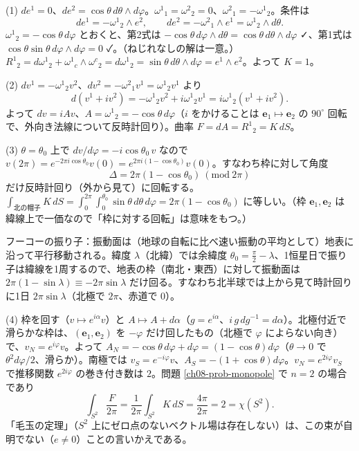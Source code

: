 \begin{solution}
(1) $de^1=0$、$de^2=\cos\theta\,d\theta\wedge d\varphi$。$\omega^1{}_1=\omega^2{}_2=0$、$\omega^2{}_1=-\omega^1{}_2$。条件は
\[
de^1=-\omega^1{}_2\wedge e^2,\qquad de^2=-\omega^2{}_1\wedge e^1=\omega^1{}_2\wedge d\theta .
\]
$\omega^1{}_2=-\cos\theta\,d\varphi$ とおくと、第2式は $-\cos\theta\,d\varphi\wedge d\theta=\cos\theta\,d\theta\wedge d\varphi$ ✓、第1式は $\cos\theta\sin\theta\,d\varphi\wedge d\varphi=0$ ✓。（ねじれなしの解は一意。）$R^1{}_2=d\omega^1{}_2+\omega^1{}_c\wedge\omega^c{}_2=d\omega^1{}_2=\sin\theta\,d\theta\wedge d\varphi=e^1\wedge e^2$。よって $K=1$。

(2) $dv^1=-\omega^1{}_2v^2$、$dv^2=-\omega^2{}_1v^1=\omega^1{}_2v^1$ より
\[
d(v^1+iv^2)=-\omega^1{}_2v^2+i\omega^1{}_2v^1=i\omega^1{}_2(v^1+iv^2).
\]
よって $dv=iAv$、$A=\omega^1{}_2=-\cos\theta\,d\varphi$（$i$ をかけることは $\bm e_1\mapsto\bm e_2$ の $90^\circ$ 回転で、外向き法線について反時計回り）。曲率 $F=dA=R^1{}_2=K\,dS$。

(3) $\theta=\theta_0$ 上で $dv/d\varphi=-i\cos\theta_0\,v$ なので $v(2\pi)=e^{-2\pi i\cos\theta_0}v(0)=e^{2\pi i(1-\cos\theta_0)}v(0)$。すなわち枠に対して角度
\[
\Delta=2\pi(1-\cos\theta_0)\ (\mathrm{mod}\ 2\pi)
\]
だけ反時計回り（外から見て）に回転する。$\int_{\text{北の帽子}}K\,dS=\int_0^{2\pi}\!\int_0^{\theta_0}\sin\theta\,d\theta\,d\varphi=2\pi(1-\cos\theta_0)$ に等しい。（枠 $\bm e_1,\bm e_2$ は緯線上で一価なので「枠に対する回転」は意味をもつ。）

フーコーの振り子：振動面は（地球の自転に比べ速い振動の平均として）地表に沿って平行移動される。緯度 $\lambda$（北緯）では余緯度 $\theta_0=\frac\pi2-\lambda$、1恒星日で振り子は緯線を1周するので、地表の枠（南北・東西）に対して振動面は $2\pi(1-\sin\lambda)\equiv-2\pi\sin\lambda$ だけ回る。すなわち北半球では上から見て時計回りに1日 $2\pi\sin\lambda$（北極で $2\pi$、赤道で $0$）。

(4) 枠を回す（$v\mapsto e^{i\alpha}v$）と $A\mapsto A+d\alpha$（$g=e^{i\alpha}$、$i\,g\,dg^{-1}=d\alpha$）。北極付近で滑らかな枠は、$(\bm e_1,\bm e_2)$ を $-\varphi$ だけ回したもの（北極で $\varphi$ によらない向き）で、$v_N=e^{i\varphi}v$。よって $A_N=-\cos\theta\,d\varphi+d\varphi=(1-\cos\theta)d\varphi$（$\theta\to0$ で $\theta^2d\varphi/2$、滑らか）。南極では $v_S=e^{-i\varphi}v$、$A_S=-(1+\cos\theta)d\varphi$。$v_N=e^{2i\varphi}v_S$ で推移関数 $e^{2i\varphi}$ の巻き付き数は $2$。問題 \ref{ch08-prob-monopole} で $n=2$ の場合であり
\[
\int_{S^2}\frac{F}{2\pi}=\frac1{2\pi}\int_{S^2}K\,dS=\frac{4\pi}{2\pi}=2=\chi(S^2).
\]
「毛玉の定理」（$S^2$ 上にゼロ点のないベクトル場は存在しない）は、この束が自明でない（$e\ne0$）ことの言いかえである。
\end{solution}

